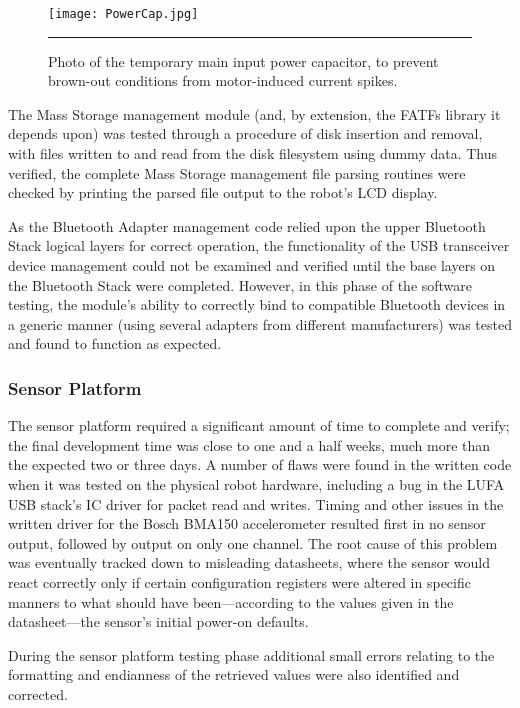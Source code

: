 \begin{figure}[tbph]
	\vspace{1em}
	\centering
		\texttt{[image: PowerCap.jpg]}
	\rule{35em}{0.5pt}
	\caption[Temporary main power input capacitor]{Photo of the temporary main input power capacitor, to prevent brown-out conditions from motor-induced current spikes.}
	\label{fig:mainpowercap}
\end{figure}

The Mass Storage management module (and, by extension, the FATFs library it depends upon) was tested through a procedure of disk insertion and removal, with files written to and read from the disk filesystem using dummy data. Thus verified, the complete Mass Storage management file parsing routines were checked by printing the parsed file output to the robot's LCD display.

As the Bluetooth Adapter management code relied upon the upper Bluetooth Stack logical layers for correct operation, the functionality of the USB transceiver device management could not be examined and verified until the base layers on the Bluetooth Stack were completed. However, in this phase of the software testing, the module's ability to correctly bind to compatible Bluetooth devices in a generic manner (using several adapters from different manufacturers) was tested and found to function as expected.

\subsubsection{Sensor Platform}

The sensor platform required a significant amount of time to complete and verify; the final development time was close to one and a half weeks, much more than the expected two or three days. A number of flaws were found in the written code when it was tested on the physical robot hardware, including a bug in the LUFA USB stack's IC driver for packet read and writes. Timing and other issues in the written driver for the Bosch BMA150 accelerometer resulted first in no sensor output, followed by output on only one channel. The root cause of this problem was eventually tracked down to misleading datasheets, where the sensor would react correctly only if certain configuration registers were altered in specific manners to what should have been---according to the values given in the datasheet---the sensor's initial power-on defaults.

During the sensor platform testing phase additional small errors relating to the formatting and endianness of the retrieved values were also identified and corrected.

